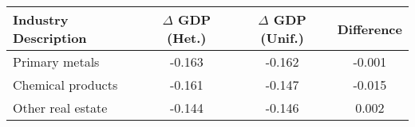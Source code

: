\begin{tabular}{lccc}
\toprule
Industry Description & $\Delta$ GDP (Het.) & $\Delta$ GDP (Unif.) & Difference \\
\midrule
Primary metals & -0.163 & -0.162 & -0.001 \\
Chemical products & -0.161 & -0.147 & -0.015 \\
Other real estate & -0.144 & -0.146 & 0.002 \\
\bottomrule
\end{tabular}

